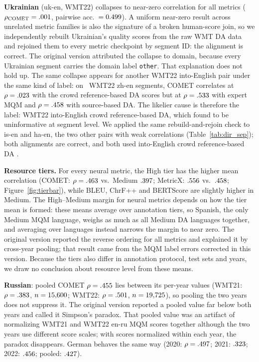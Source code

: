 \documentclass[11pt]{article}
\begin{document}
\textbf{Ukrainian} (uk-en, WMT22) collapses to near-zero correlation for all metrics ($\rho_{\text{COMET}} = .001$, pairwise acc.\ $= 0.499$). A uniform near-zero result across unrelated metric families is also the signature of a broken human-score join, so we independently rebuilt Ukrainian's quality scores from the raw WMT DA data and rejoined them to every metric checkpoint by segment ID: the alignment is correct. The original version attributed the collapse to domain, because every Ukrainian segment carries the domain label \texttt{other}. That explanation does not hold up. The same collapse appears for another WMT22 into-English pair under the same kind of label: on \MqmCtrlZhTwentyTwoN\ WMT22 zh-en segments, COMET correlates at $\rho=.023$ with the crowd reference-based DA scores but at $\rho=.533$ with expert MQM and $\rho=.458$ with source-based DA. The likelier cause is therefore the label: WMT22 into-English crowd reference-based DA, which \citet{freitag2022results} found to be uninformative at segment level. We applied the same rebuild-and-rejoin check to is-en and ha-en, the two other pairs with weak correlations (Table~\ref{tab:dir_sep}); both alignments are correct, and both used into-English crowd reference-based DA \citep[pp.~11, 14]{akhbardeh-etal-2021-findings}.

\textbf{Resource tiers.} For every neural metric, the High tier has the higher mean correlation (COMET: $\rho=.463$ vs.\ Medium $.397$; MetricX: $.556$ vs.\ $.458$; Figure~\ref{fig:tierbar}), while BLEU, ChrF++ and BERTScore are slightly higher in Medium. The High--Medium margin for neural metrics depends on how the tier mean is formed: these means average over annotation tiers, so Spanish, the only Medium MQM language, weighs as much as all Medium DA languages together, and averaging over languages instead narrows the margin to near zero. The original version reported the reverse ordering for all metrics and explained it by cross-year pooling; that result came from the MQM label errors corrected in this version. Because the tiers also differ in annotation protocol, test sets and years, we draw no conclusion about resource level from these means.

\textbf{Russian}: pooled COMET $\rho=.455$ lies between its per-year values (WMT21: $\rho=.383$, $n=15{,}600$; WMT22: $\rho=.501$, $n=19{,}725$), so pooling the two years does not suppress it. The original version reported a pooled value far below both years and called it Simpson's paradox. That pooled value was an artifact of normalizing WMT21 and WMT22 en-ru MQM scores together although the two years use different score scales; with scores normalized within each year, the paradox disappears. German behaves the same way (2020: $\rho=.497$; 2021: $.323$; 2022: $.456$; pooled: $.427$).
\end{document}
